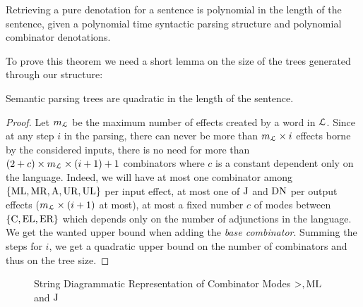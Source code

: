 \begin{theorem}
	\label{thm:ptime-denot}
	Retrieving a pure denotation for a sentence is polynomial in
	the length of the sentence, given a polynomial time syntactic parsing
	structure and polynomial combinator denotations.
\end{theorem}

\noindent To prove this theorem we need a short lemma on the size of the trees generated
through our structure:
\begin{lemma}
	\label{lem:quad-tree}
	Semantic parsing trees are quadratic in the length of the sentence.
\end{lemma}

\begin{proof}
	Let $m_{\mathcal{L}}$ be the maximum number of effects created by a word in $\mathcal{L}$.
	Since at any step $i$ in the parsing, there can never be more than
	$m_{\mathcal{L}}\times i$ effects borne by the considered inputs, there is no need
	for more than $(2 + c) \times m_{\mathcal{L}}\times (i + 1) + 1$ combinators where
	$c$ is a constant dependent only on the language.
	Indeed, we will have at most one combinator among
	$\{\text{ML}, \text{MR}, \text{A}, \text{UR}, \text{UL}\}$ per input effect, at most one
	of $\text{J}$ and $\text{DN}$ per output effects
	($m_{\mathcal{L}} \times (i + 1)$ at most),	at most a fixed number $c$ of modes
	between $\{\text{C}, \text{EL}, \text{ER}\}$ which depends only on the number of
	adjunctions in the language.
	We get the wanted upper bound when adding the \emph{base combinator}.
	Summing the steps for $i$, we get a quadratic upper bound on the number of
	combinators and thus on the tree size.
\end{proof}

\begin{figure}
	\centering
	
	\caption{String Diagrammatic Representation of Combinator Modes $>, \text{ML}$ and $\text{J}$}
	\label{fig:combinator-sd}
\end{figure}

